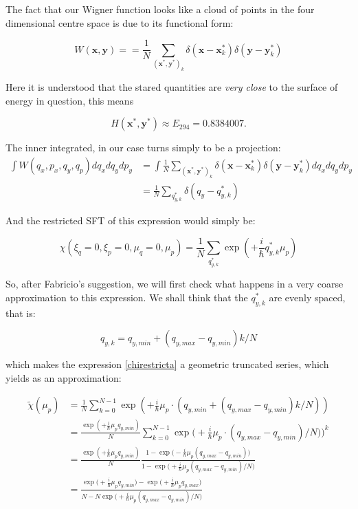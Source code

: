 \documentclass[a4paper,12pt]{article}
\newcommand{\ihb}{\frac{i}{\hbar}}
\newcommand{\xfase}{\mathbf{x}}
\newcommand{\yfase}{\mathbf{y}}
\begin{document}
The fact that our Wigner function looks like a cloud
of points in the four dimensional centre space is due 
to its functional form:

\begin{equation}
W(\xfase, \yfase)= 
=\frac{1}{N}\sum_{(\xfase^*, \yfase^*)_k} \delta (\xfase - \xfase_k^*)
\delta (\yfase - \yfase_k^*)
\end{equation}

Here it is understood that the stared quantities are
\emph{very close} to the surface of energy in question,
this means

\begin{equation}
H(\xfase^*, \yfase^*)  \approx E_{294} = 0.8384007.
\end{equation}


The inner integrated, in our case turns simply to be a projection:
\begin{align}
\int W(q_x, p_x, q_y, q_p) dq_x dq_y dp_y & =
\int 
\frac{1}{N}\sum_{(\xfase^*, \yfase^*)_k}
\delta (\xfase - \xfase_k^*)\delta (\yfase - \yfase_k^*) 
dq_x dq_y dp_y \\
& = \frac{1}{N}\sum_{q_{y,k}^*} 
 \delta(q_y - q_{y,k}^*) 
\end{align}

And the restricted SFT of this expression would simply be:

\begin{equation}\label{chirestricta}
\chi(\xi_q=0, \xi_p=0, \mu_q=0, \mu_p)  = 
\frac{1}{N}\sum_{q_{y,k}^*} \exp(+\ihb q_{y,k}^* \mu_p)
\end{equation}

So, after Fabricio's suggestion, we will first check what
happens in a very coarse approximation to this expression.
We shall think that the $q_{y,k}^*$ are evenly spaced, that is:

\begin{equation}\label{evenlyspaced}
q_{y,k}=q_{y,min}+(q_{y,max}-q_{y,min})k/N
\end{equation}

which makes the expression \ref{chirestricta} a geometric
truncated series, which yields as an approximation:

\begin{align}\label{aprox01}
\tilde{\chi}(\mu_p)  & = 
\frac{1}{N}\sum_{k=0}^{N-1} \exp(+\ihb \mu_p \cdot (q_{y,min}+(q_{y,max}-q_{y,min})k/N)) \\
& = 
\frac{ \exp(+\ihb \mu_p  q_{y,min})}{N}\sum_{k=0}^{N-1} 
\exp\big(+\ihb \mu_p \cdot (q_{y,max}-q_{y,min})/N)\big)^k   \\
& = \frac{\exp(+\ihb \mu_p  q_{y,min})}{N} 
\frac{ 1 - \exp\big(-\ihb \mu_p (q_{y,max}- q_{y,min})\big)}
{ 1 - \exp\big(+\ihb \mu_p (q_{y,max}- q_{y,min})/N\big)} \\
& =\frac{\exp\big(+\ihb \mu_p q_{y,min}\big) - \exp\big(+\ihb \mu_p q_{y,max}\big)}
{ N - N \exp\big(+\ihb \mu_p (q_{y,max}- q_{y,min})/N\big)} \\
\end{align}
\end{document}

